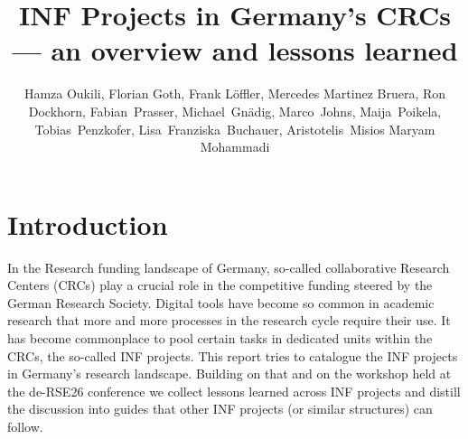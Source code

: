 \documentclass{eceasst}
\title{INF Projects in Germany's CRCs --- an overview and lessons learned}
\author{
Hamza Oukili\authorOrcid{0000-0003-4695-8532}\authorRef{1},
Florian Goth\authorOrcid{0000-0003-2707-4790}\authorRef{2},
Frank Löffler\authorOrcid{0000-0001-6643-6323}\authorRef{3},
Mercedes Martinez Bruera\authorOrcid{0009-0004-2891-7045}\authorRef{4},
Ron Dockhorn\authorOrcid{0000-0002-5268-5430}\authorRef{{TUD}},
Fabian~Prasser\authorOrcid{0000-0003-3172-3095}\authorRef{5},
Michael~Gnädig\authorOrcid{}\authorRef{5},
Marco~Johns\authorOrcid{0000-0003-4706-6595}\authorRef{5},
Maija~Poikela\authorOrcid{0000-0003-2616-4401}\authorRef{5}, 
Tobias~Penzkofer\authorOrcid{0000-0001-9591-8575}\authorRef{6}, 
Lisa~Franziska~Buchauer\authorOrcid{0000-0002-4722-8390}\authorRef{6}, 
Aristotelis~Misios\authorOrcid{}\authorRef{6}
Maryam Mohammadi\authorOrcid{0009-0007-8747-029X}\authorRef{7}
} %
\institute{%
\autlabel{1} Institute for Modeling Hydraulic and Environmental Systems (IWS), University of Stuttgart,\\
\autlabel{2} Institut für theoretische Physik 1, University of Würzburg, 97074, Würzburg,\\
\autlabel{3} Heinz Nixdorf Chair for Distributed Information Systems, Jena, Germany,\\
\autlabel{4} Goethe-Universität Frankfurt am Main, Frankfurt am Main,\\
\autlabel{{TUD}} Center for Interdisciplinary Digital Sciences, Technische Universität Dresden, D-01069 Dresden, Germany,\\
\autlabel{5} Berlin Institute of Health at Charité - Universitätsmedizin Berlin, Berlin, Germany\\
\autlabel{6} Universitätsmedizin Berlin, Berlin, Germany\\
\autlabel{7} Linguistic Department, University of Bielefeld\\
}
\begin{document}
\maketitle

\section{Introduction}
In the Research funding landscape of Germany, so-called collaborative Research Centers (CRCs) play a crucial role in the competitive funding steered by the German Research Society.
Digital tools have become so common in academic research that more and more processes in the research cycle require their use.
It has become commonplace to pool certain tasks in dedicated units within the CRCs, the so-called INF projects.
This report tries to catalogue the INF projects in Germany's research landscape.
Building on that and on the workshop held at the de-RSE26 conference we collect lessons learned across INF projects and distill the discussion into guides that other INF projects (or similar structures) can follow.
\end{document}
